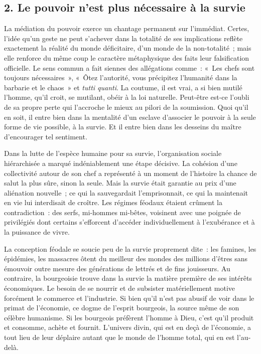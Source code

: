 \documentclass[french,twoside]{book} %
\begin{document}
\subsection[{2. Le pouvoir n’est plus nécessaire à la survie}]{\textsc{2.} Le pouvoir n’est plus nécessaire à la survie}
\noindent La médiation du pouvoir exerce un chantage permanent sur l’immédiat. Certes, l’idée qu’un geste ne peut s’achever dans la totalité de ses implications reflète exactement la réalité du monde déficitaire, d’un monde de la non-totalité ; mais elle renforce du même coup le caractère métaphysique des faits leur falsification officielle. Le sens commun a fait siennes des allégations comme : « Les chefs sont toujours nécessaires », « Ôtez l’autorité, vous précipitez l’humanité dans la barbarie et le chaos » et \emph{tutti quanti}. La coutume, il est vrai, a si bien mutilé l’homme, qu’il croit, se mutilant, obéir à la loi naturelle. Peut-être est-ce l’oubli de sa propre perte qui l’accroche le mieux au pilori de la soumission. Quoi qu’il en soit, il entre bien dans la mentalité d’un esclave d’associer le pouvoir à la seule forme de vie possible, à la survie. Et il entre bien dans les desseins du maître d’encourager tel sentiment.\par
Dans la lutte de l’espèce humaine pour sa survie, l’organisation sociale hiérarchisée a marqué indéniablement une étape décisive. La cohésion d’une collectivité autour de son chef a représenté à un moment de l’histoire la chance de salut la plus sûre, sinon la seule. Mais la survie était garantie au prix d’une aliénation nouvelle ; ce qui la sauvegardait l’emprisonnait, ce qui la maintenait en vie lui interdisait de croître. Les régimes féodaux étaient crûment la contradiction : des serfs, mi-hommes mi-bêtes, voisinent avec une poignée de privilégiés dont certains s’efforcent d’accéder individuellement à l’exubérance et à la puissance de vivre.\par
La conception féodale se soucie peu de la survie proprement dite : les famines, les épidémies, les massacres ôtent du meilleur des mondes des millions d’êtres sans émouvoir outre mesure des générations de lettrés et de fins jouisseurs. Au contraire, la bourgeoisie trouve dans la survie la matière première de ses intérêts économiques. Le besoin de se nourrir et de subsister matériellement motive forcément le commerce et l’industrie. Si bien qu’il n’est pas abusif de voir dans le primat de l’économie, ce dogme de l’esprit bourgeois, la source même de son célèbre humanisme. Si les bourgeois préfèrent l’homme à Dieu, c’est qu’il produit et consomme, achète et fournit. L’univers divin, qui est en deçà de l’économie, a tout lieu de leur déplaire autant que le monde de l’homme total, qui en est l’au-delà.\par
\end{document}
